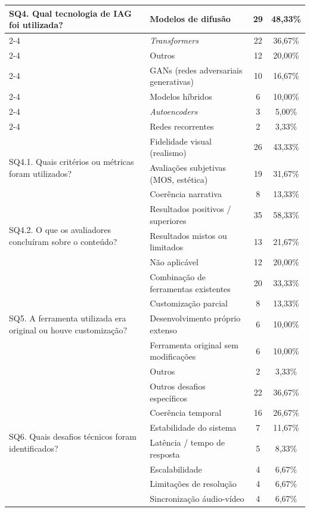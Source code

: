 \begin{longtable}{|p{4.2cm}|p{5.2cm}|c|c|}
\multirow{7}{=}{SQ4. Qual tecnologia de IAG foi utilizada?}
& Modelos de difusão & 29 & 48,33\% \\ \cline{2-4}
& \textit{Transformers} & 22 & 36,67\% \\ \cline{2-4}
& Outros & 12 & 20,00\% \\ \cline{2-4}
& GANs (redes adversariais generativas) & 10 & 16,67\% \\ \cline{2-4}
& Modelos híbridos & 6 & 10,00\% \\ \cline{2-4}
& \textit{Autoencoders} & 3 & 5,00\% \\ \cline{2-4}
& Redes recorrentes & 2 & 3,33\% \\
\hline

\multirow{3}{=}{SQ4.1. Quais critérios ou métricas foram utilizados?}
& Fidelidade visual (realismo) & 26 & 43,33\% \\ \cline{2-4}
& Avaliações subjetivas (MOS, estética) & 19 & 31,67\% \\ \cline{2-4}
& Coerência narrativa & 8 & 13,33\% \\
\hline

\multirow{3}{=}{SQ4.2. O que os avaliadores concluíram sobre o conteúdo?}
& Resultados positivos / superiores & 35 & 58,33\% \\ \cline{2-4}
& Resultados mistos ou limitados & 13 & 21,67\% \\ \cline{2-4}
& Não aplicável & 12 & 20,00\% \\
\hline

\multirow{5}{=}{SQ5. A ferramenta utilizada era original ou houve customização?}
& Combinação de ferramentas existentes & 20 & 33,33\% \\ \cline{2-4}
& Customização parcial & 8 & 13,33\% \\ \cline{2-4}
& Desenvolvimento próprio extenso & 6 & 10,00\% \\ \cline{2-4}
& Ferramenta original sem modificações & 6 & 10,00\% \\ \cline{2-4}
& Outros & 2 & 3,33\% \\
\hline

\multirow{7}{=}{SQ6. Quais desafios técnicos foram identificados?}
& Outros desafios específicos & 22 & 36,67\% \\ \cline{2-4}
& Coerência temporal & 16 & 26,67\% \\ \cline{2-4}
& Estabilidade do sistema & 7 & 11,67\% \\ \cline{2-4}
& Latência / tempo de resposta & 5 & 8,33\% \\ \cline{2-4}
& Escalabilidade & 4 & 6,67\% \\ \cline{2-4}
& Limitações de resolução & 4 & 6,67\% \\ \cline{2-4}
& Sincronização áudio-vídeo & 4 & 6,67\% \\
\hline


\end{longtable}
